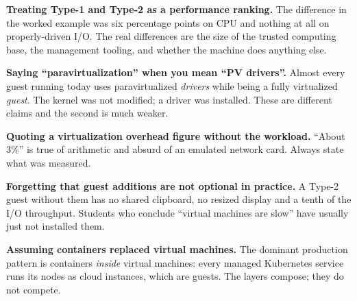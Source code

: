 \begin{pitfall}
\begin{tight}
  \item \textbf{Treating Type-1 and Type-2 as a performance ranking.} The
        difference in the worked example was six percentage points on CPU and
        nothing at all on properly-driven I/O. The real differences are the
        size of the trusted computing base, the management tooling, and whether
        the machine does anything else.
  \item \textbf{Saying ``paravirtualization'' when you mean ``PV drivers''.}
        Almost every guest running today uses paravirtualized \emph{drivers}
        while being a fully virtualized \emph{guest}. The kernel was not
        modified; a driver was installed. These are different claims and the
        second is much weaker.
  \item \textbf{Quoting a virtualization overhead figure without the
        workload.} ``About 3\%'' is true of arithmetic and absurd of an
        emulated network card. Always state what was measured.
  \item \textbf{Forgetting that guest additions are not optional in
        practice.} A Type-2 guest without them has no shared clipboard, no
        resized display and a tenth of the I/O throughput. Students who
        conclude ``virtual machines are slow'' have usually just not installed
        them.
  \item \textbf{Assuming containers replaced virtual machines.} The dominant
        production pattern is containers \emph{inside} virtual machines: every
        managed Kubernetes service runs its nodes as cloud instances, which are
        guests. The layers compose; they do not compete.
\end{tight}
\end{pitfall}


